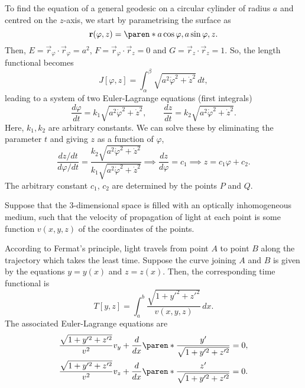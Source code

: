 \documentclass[11pt]{penrose}
\begin{document}
\begin{negg}
    To find the equation of a general geodesic on a circular cylinder of radius $a$ and centred on the $z$-axis, we start by parametrising the surface as
    \begin{equation}
        \vec{r}(\varphi, z) = \paren*{a\cos\varphi, a\sin\varphi, z}.
    \end{equation}
    Then, $E = \vec{r}_\varphi \cdot \vec{r}_\varphi = a^2$, $F = \vec{r}_\varphi \cdot \vec{r}_z = 0$ and $G = \vec{r}_z \cdot \vec{r}_z = 1$. So, the length functional becomes
    \begin{equation}
        J[\varphi, z] = \int_\alpha^\beta \sqrt{a^2 \dot{\varphi}^2 + \dot{z}^2} \,dt,
    \end{equation}
    leading to a system of two Euler-Lagrange equations (first integrals)
    \begin{equation}
        \frac{d\varphi}{dt} = k_1 \sqrt{a^2 \dot{\varphi}^2 + \dot{z}^2},
        \qquad
        \frac{dz}{dt} = k_2 \sqrt{a^2 \dot{\varphi}^2 + \dot{z}^2}.
    \end{equation}
    Here, $k_1, k_2$ are arbitrary constants. We can solve these by eliminating the parameter $t$ and giving $z$ as a function of $\varphi$,
    \begin{equation}
        \frac{dz/dt}{d\varphi/dt}
        = \frac{k_2 \sqrt{a^2 \dot{\varphi}^2 + \dot{z}^2}}{k_1 \sqrt{a^2 \dot{\varphi}^2 + \dot{z}^2}}
        \implies
        \frac{dz}{d\varphi} = c_1
        \implies
        z = c_1 \varphi + c_2.
    \end{equation}
    The arbitrary constant $c_1$, $c_2$ are determined by the points $P$ and $Q$.
\end{negg}

\begin{negg}
    Suppose that the $3$-dimensional space is filled with an optically inhomogeneous medium, such that the velocity of propagation of light at each point is some function $v(x, y, z)$ of the coordinates of the points.

    According to Fermat's principle, light travels from point $A$ to point $B$ along the trajectory which takes the least time. Suppose the curve joining $A$ and $B$ is given by the equations $y = y(x)$ and $z = z(x)$. Then, the corresponding time functional is
    \begin{equation}
        T[y, z] = \int_a^b \frac{\sqrt{1 + y'^2 + z'^2}}{v(x, y, z)} \,dx.
    \end{equation}
    The associated Euler-Lagrange equations are
    \begin{gather}
        \frac{\sqrt{1 + y'^2 + z'^2}}{v^2} v_y
        + \frac{d}{dx}\paren*{\frac{y'}{\sqrt{1 + y'^2 + z'^2}}} = 0,\\
        \frac{\sqrt{1 + y'^2 + z'^2}}{v^2} v_z
        + \frac{d}{dx}\paren*{\frac{z'}{\sqrt{1 + y'^2 + z'^2}}} = 0.
    \end{gather}
\end{negg}
\end{document}
